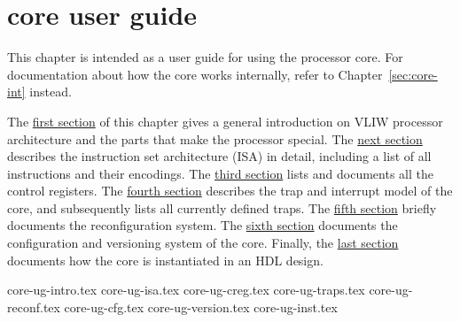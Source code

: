 \chapter{\rvex{} core user guide}
\label{sec:core-ug}

This chapter is intended as a user guide for using the \rvex{} processor core.
For documentation about how the core works internally, refer to
Chapter~\ref{sec:core-int} instead.

The \hyperref[sec:core-ug-intro]{first section} of this chapter gives a general 
introduction on VLIW processor architecture and the parts that make the \rvex{} 
processor special. The \hyperref[sec:core-ug-isa]{next section} describes the 
instruction set architecture (ISA) in detail, including a list of all 
instructions and their encodings. The \hyperref[sec:core-ug-creg]{third section} 
lists and documents all the control registers. The 
\hyperref[sec:core-ug-traps]{fourth section} describes the trap and interrupt 
model of the core, and subsequently lists all currently defined traps. The 
\hyperref[sec:core-ug-reconf]{fifth section} briefly documents the 
reconfiguration system. The 
\hyperref[sec:core-ug-cfg]{sixth section} documents the configuration and
versioning system of the core. Finally, the \hyperref[sec:core-ug-inst]{last 
section} documents how the core is instantiated in an HDL design.

{core-ug-intro.tex}
{core-ug-isa.tex}
{core-ug-creg.tex}
{core-ug-traps.tex}
{core-ug-reconf.tex}
{core-ug-cfg.tex}
{core-ug-version.tex}
{core-ug-inst.tex}
